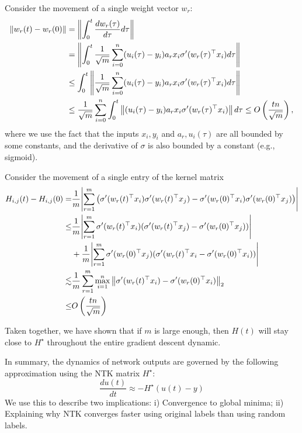 Consider the movement of a single weight vector $w_r$:
\begin{align*}
    \left\|  w_r(t) - w_r(0)  \right\| &= \left\|  \int_{0}^t \frac {d w_r(\tau)} {d \tau} d \tau  \right\| \\
    &= \left\|  \int_{0}^t \frac 1 {\sqrt m} \sum_{i = 0}^n (u_i(\tau) - y_i ) a_r x_i \sigma'( w_r(\tau)^{\top} x_i ) d \tau  \right\| \\
    &\le \int_{0}^t \left\|  \frac 1 {\sqrt m} \sum_{i= 0}^n (u_i(\tau) - y_i) a_r x_i \sigma'(w_r (\tau)^{\top} x_i) d\tau  \right\| \\
    &\le \frac 1 {\sqrt m} \sum_{i=0}^n \int_0^t \left\|  (u_i(\tau) - y_i) a_r x_i \sigma'(w_r(\tau)^{\top} x_i)   \right\|d\tau \le O\left(\frac {t n} {\sqrt m}\right),
\end{align*}
where we use the fact that the inputs $x_i, y_i$ and $a_r, u_i(\tau)$ are all bounded by some constants, and the derivative of $\sigma$ is also bounded by a constant (e.g., sigmoid).

Consider the movement of a single entry of the kernel matrix
\begin{align*}
    H_{i, j}(t) - H_{i, j}(0) =& \frac 1 m {\left| {\sum_{r = 1}^m \left( \sigma'(w_r(t)^{\top} x_i) \sigma'(w_r(t)^{\top} x_j) - \sigma'(w_r(0)^{\top} x_i) \sigma'(w_r(0)^{\top} x_j)\right) } \right|} \\
    \le& \frac 1 m {\left| {\sum_{r = 1}^m \sigma'(w_r(t)^{\top} x_i) ( \sigma'(w_r(t)^{\top} x_j ) - \sigma'(w_r(0)^{\top} x_j) ) } \right|} \\
    &+ \frac 1 m {\left| {\sum_{r = 1}^m \sigma'(w_r(0)^{\top} x_j) (\sigma'(w_r(t)^{\top} x_i - \sigma'(w_r(0)^{\top} x_i))} \right|} \\
    \lesssim& \frac 1 m \sum_{r = 1}^m \max_{i = 1}^n \left\|  \sigma'(w_r(t)^{\top} x_i) - \sigma'(w_r(0)^{\top} x_i)  \right\|_{2} \\
    \le& O\left( \frac {t n} {\sqrt m} \right)
\end{align*}

Taken together, we have shown that if $m$ is large enough, then $H(t)$ will stay close to $H^{\star}$ throughout the entire gradient descent dynamic.

In summary, the dynamics of network outputs are governed by the following approximation using the NTK matrix $H^{\star}$:
\[ \frac {d u(t)} {d t} \approx - H^{\star} (u(t) - y) \]
We use this to describe two implications:
i) Convergence to global minima;
ii) Explaining why NTK converges faster using original labels than using random labels.

